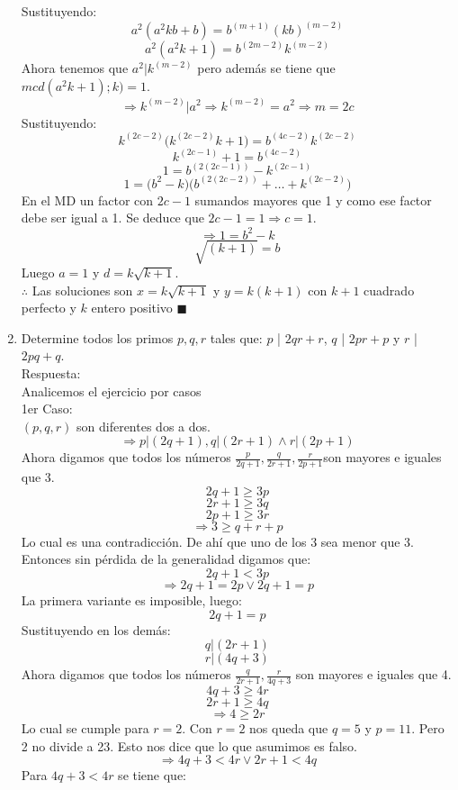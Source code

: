 \documentclass{book}
\begin{document}
\begin{enumerate}
        Sustituyendo:
        $$a^2 (a^2 kb+b)=b^{(m+1)} {(kb)}^{(m-2)}$$
        $$a^2 (a^2 k+1)=b^{(2m-2)} k^{(m-2)}$$
        Ahora tenemos que $a^2|k^{(m-2)}$  pero además se tiene que $mcd(a^2 k+1);k )=1$.\\
        $$\Rightarrow k^{(m-2)}|a^2 \Rightarrow k^{(m-2)}=a^2\Rightarrow m=2c$$
        Sustituyendo:
        $$k^{(2c-2)} \big(k^{(2c-2)} k+1\big)=b^{(4c-2)} k^{(2c-2)}$$
        $$k^{(2c-1)}+1=b^{(4c-2)}$$
        $$1=b^{(2(2c-1))}-k^{(2c-1)}$$
        $$1=\big(b^2-k)(b^{(2(2c-2))}+\ldots+k^{(2c-2)}\big)$$
        En el MD un factor con $2c-1$ sumandos mayores que 1 y como ese factor debe ser igual a 1. Se deduce que $2c-1=1\Rightarrow c=1$.
        $$\Rightarrow 1=b^2-k$$
        $$\sqrt{(k+1)}=b$$
        Luego $a=1$ y $d=k\sqrt{k+1}$.\\
        $\therefore$ Las soluciones son $x=k\sqrt{k+1}$ y $y=k(k+1)$ con $k+1$ cuadrado perfecto y $k$ entero positivo $\blacksquare$\\
        \item Determine todos los primos $p,q,r$ tales que: $p$ | $2qr+r$, $q$ | $2pr+p$ y $r$ | $2pq+q$.\\
        Respuesta:\\
        Analicemos el ejercicio por casos\\
        1er Caso: \\
        $(p,q,r)$ son diferentes dos a dos.\\
        $$\Rightarrow p|(2q + 1)  ,   q|(2r + 1)  \wedge  r|(2p + 1)$$
        Ahora digamos que todos los números $\displaystyle{\frac{p}{2q + 1}  ,   \frac{q}{2r + 1}  ,  \frac{r}{2p + 1}}$son mayores e iguales que 3.
        $$ 2q + 1\geq 3p$$
        $$2r + 1\geq 3q$$
        $$2p + 1\geq 3r$$
        $$\Rightarrow 3\geq q+r+p$$
        Lo cual es una contradicción. De ahí que uno de los 3 sea menor que 3. Entonces sin pérdida de la generalidad digamos que:
        $$2q + 1<3p$$
        $$\Rightarrow 2q + 1=2p   \vee   2q + 1=p$$
        La primera variante es imposible, luego:
        $$2q + 1=p$$
        Sustituyendo en los demás:
        $$q|(2r + 1)$$   $$r|(4q + 3)$$
        Ahora digamos que todos los números $\frac{q}{2r + 1},\frac {r}{4q + 3}$ son mayores e iguales que 4.
        $$ 4q + 3\geq 4r$$
        $$ 2r + 1\geq 4q$$
        $$\Rightarrow 4 \geq 2r$$
        Lo cual se cumple para $r=2$. Con $r=2$ nos queda que $q=5$ y $p=11$. Pero 2 no divide a 23. Esto nos dice que lo que asumimos es falso.
        $$\Rightarrow 4q + 3<4r   \vee   2r + 1<4q$$
        Para $4q + 3<4r$   se tiene que:

\end{enumerate}
\end{document}
